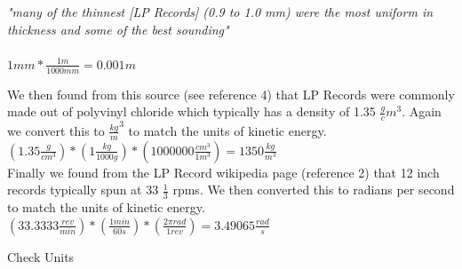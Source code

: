 \documentclass[a4paper, 11pt, oneside]{book} %
\begin{document}
\vspace{0.5\baselineskip} %
\vspace{0.5\baselineskip} %
\textit{"many of the thinnest [LP Records] (0.9 to 1.0 mm) were the most uniform in thickness and some of the best sounding"}\\
\\
\vspace{0.5\baselineskip} %
\vspace{0.5\baselineskip} %
\textit{$1mm * \frac{1m}{1000mm} = 0.001m$}\\
\vspace{0.5\baselineskip} %
\vspace{0.5\baselineskip} %

We then found from this source (see reference 4) that LP Records were commonly made out of polyvinyl chloride which typically has a density of 1.35 $\frac{g}cm^3$. Again we convert this to $\frac{kg}m^3$ to match the units of kinetic energy. \\
\vspace{0.5\baselineskip} %
\vspace{0.5\baselineskip} %
$(1.35\frac{g}{cm^3}) * (1\frac{kg}{1000g})*(1000000\frac{cm^3}{1m^3}) = 1350\frac{kg}{m^3}$\\
\vspace{0.5\baselineskip} %
\vspace{0.5\baselineskip} %
Finally we found from the LP Record wikipedia page (reference 2) that 12 inch records typically spun at 33 $\frac{1}{3}$ rpms. We then converted this to radians per second to match the units of kinetic energy.\\
\vspace{0.5\baselineskip} %
\vspace{0.5\baselineskip} %
$(33.3333 \frac{rev}{min})*(\frac{1min}{60s})*(\frac{2\pi rad}{1rev}) = 3.49065 \frac{rad}{s}$
\vspace{0.5\baselineskip} %
\vspace{0.5\baselineskip} %

{\LARGE Check Units \\} %
\vspace{0.5\baselineskip} %
\vspace{0.5\baselineskip} %
\end{document}
